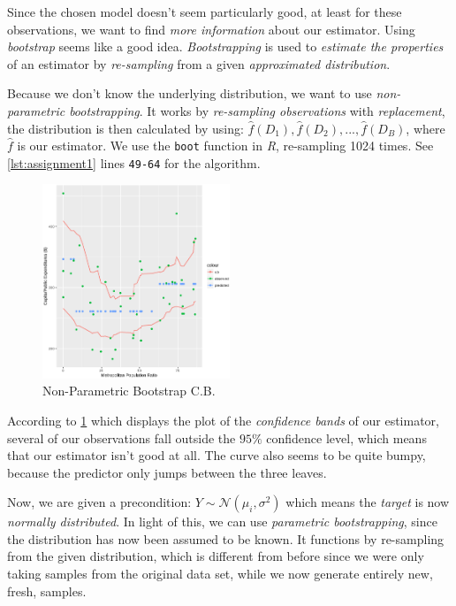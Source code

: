 \documentclass[a4paper, twocolumn]{article}
\begin{document}
        Since the chosen model doesn't seem particularly good, at least for these observations, we want to find \emph{more information} about our estimator. Using \emph{bootstrap} seems like a good idea. \emph{Bootstrapping} is used to \emph{estimate the properties} of an estimator by \emph{re-sampling} from a given \emph{approximated distribution}.

        Because we don't know the underlying distribution, we want to use \emph{non-parametric bootstrapping}. It works by \emph{re-sampling observations} with \emph{replacement}, the distribution is then calculated by using: \(\hat{f}(D_1), \hat{f}(D_2), ..., \hat{f}(D_B)\), where \(\hat{f}\) is our estimator. We use the \verb|boot| function in \emph{R}, re-sampling 1024 times. See \cref{lst:assignment1} lines \verb|49-64| for the algorithm.

        \begin{figure}[h!]
            \centering
            \caption{Non-Parametric Bootstrap C.B.}
            \label{fig:npbands}
            \includegraphics[width=0.5\textwidth]{share/npbands.eps}
        \end{figure}

        According to \cref{fig:npbands} which displays the plot of the \emph{confidence bands} of our estimator, several of our observations fall outside the \(95 \%\) confidence level, which means that our estimator isn't good at all. The curve also seems to be quite bumpy, because the predictor only jumps between the three leaves.

        Now, we are given a precondition: \(Y \sim \mathcal{N}(\mu_i, \sigma^2)\) which means the \emph{target} is now \emph{normally distributed}. In light of this, we can use \emph{parametric bootstrapping}, since the distribution has now been assumed to be known. It functions by re-sampling from the given distribution, which is different from before since we were only taking samples from the original data set, while we now generate entirely new, fresh, samples.
\end{document}
